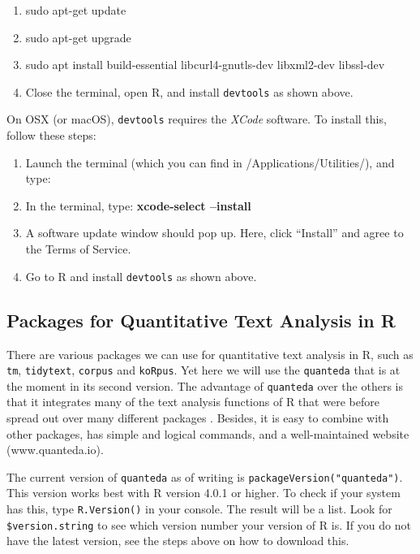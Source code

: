 \documentclass[
]{article}
\providecommand{\tightlist}{%
  \setlength{\itemsep}{0pt}\setlength{\parskip}{0pt}}
\begin{document}
\begin{enumerate}
\def\labelenumi{\arabic{enumi}.}
\tightlist
\item
  sudo apt-get update
\item
  sudo apt-get upgrade
\item
  sudo apt install build-essential libcurl4-gnutls-dev libxml2-dev libssl-dev
\item
  Close the terminal, open R, and install \texttt{devtools} as shown above.
\end{enumerate}

On OSX (or macOS), \texttt{devtools} requires the \emph{XCode} software. To install this, follow these steps:

\begin{enumerate}
\def\labelenumi{\arabic{enumi}.}
\tightlist
\item
  Launch the terminal (which you can find in /Applications/Utilities/), and type:
\item
  In the terminal, type: \textbf{xcode-select --install}
\item
  A software update window should pop up. Here, click ``Install'' and agree to the Terms of Service.
\item
  Go to R and install \texttt{devtools} as shown above.
\end{enumerate}

\hypertarget{packages-for-quantitative-text-analysis-in-r}{%
\subsection{Packages for Quantitative Text Analysis in R}\label{packages-for-quantitative-text-analysis-in-r}}

There are various packages we can use for quantitative text analysis in R, such as \texttt{tm}, \texttt{tidytext}, \texttt{corpus} and \texttt{koRpus}. Yet here we will use the \texttt{quanteda} \autocite{Benoit2018a} that is at the moment in its second version. The advantage of \texttt{quanteda} over the others is that it integrates many of the text analysis functions of R that were before spread out over many different packages \autocite{Welbers2017a}. Besides, it is easy to combine with other packages, has simple and logical commands, and a well-maintained website (www.quanteda.io).

The current version of \texttt{quanteda} as of writing is \texttt{packageVersion("quanteda")}. This version works best with R version 4.0.1 or higher. To check if your system has this, type \texttt{R.Version()} in your console. The result will be a list. Look for \texttt{\$version.string} to see which version number your version of R is. If you do not have the latest version, see the steps above on how to download this.
\end{document}
